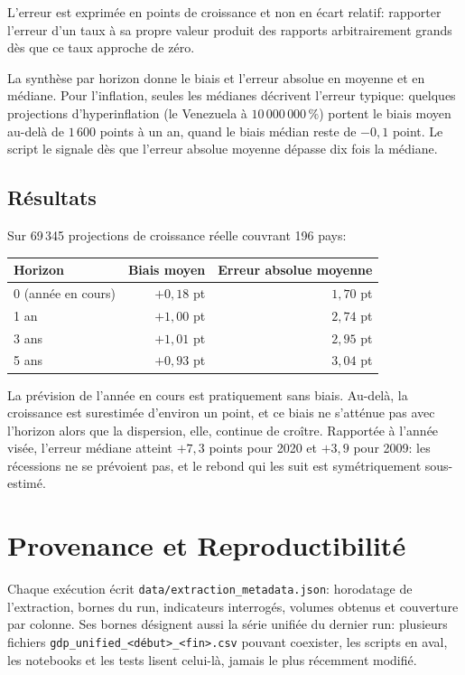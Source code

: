 \documentclass[11pt,a4paper]{article}
\begin{document}
L'erreur est exprimée en points de croissance et non en écart relatif: rapporter l'erreur d'un taux à sa propre valeur produit des rapports arbitrairement grands dès que ce taux approche de zéro.

La synthèse par horizon donne le biais et l'erreur absolue en moyenne et en médiane. Pour l'inflation, seules les médianes décrivent l'erreur typique: quelques projections d'hyperinflation (le Venezuela à $10\,000\,000\,\%$) portent le biais moyen au-delà de $1\,600$ points à un an, quand le biais médian reste de $-0{,}1$ point. Le script le signale dès que l'erreur absolue moyenne dépasse dix fois la médiane.

\subsection{Résultats}
Sur 69\,345 projections de croissance réelle couvrant 196 pays:

\begin{center}
\begin{tabular}{lrr}
\hline
\textbf{Horizon} & \textbf{Biais moyen} & \textbf{Erreur absolue moyenne} \\
\hline
0 (année en cours) & $+0{,}18$ pt & $1{,}70$ pt \\
1 an & $+1{,}00$ pt & $2{,}74$ pt \\
3 ans & $+1{,}01$ pt & $2{,}95$ pt \\
5 ans & $+0{,}93$ pt & $3{,}04$ pt \\
\hline
\end{tabular}
\end{center}

La prévision de l'année en cours est pratiquement sans biais. Au-delà, la croissance est surestimée d'environ un point, et ce biais ne s'atténue pas avec l'horizon alors que la dispersion, elle, continue de croître. Rapportée à l'année visée, l'erreur médiane atteint $+7{,}3$ points pour 2020 et $+3{,}9$ pour 2009: les récessions ne se prévoient pas, et le rebond qui les suit est symétriquement sous-estimé.

\section{Provenance et Reproductibilité}

Chaque exécution écrit \texttt{data/extraction\_metadata.json}: horodatage de l'extraction, bornes du run, indicateurs interrogés, volumes obtenus et couverture par colonne. Ses bornes désignent aussi la série unifiée du dernier run: plusieurs fichiers \texttt{gdp\_unified\_<début>\_<fin>.csv} pouvant coexister, les scripts en aval, les notebooks et les tests lisent celui-là, jamais le plus récemment modifié.
\end{document}
